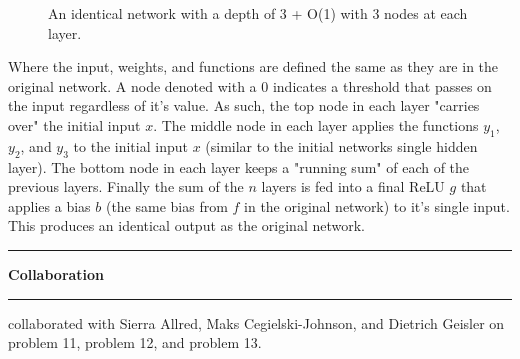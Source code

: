 \documentclass[11pt]{article}
\newcommand\question[2]{\vspace{.25in}\hrule\textbf{#1}\vspace{.5em}\hrule\vspace{.10in}}
\begin{document}
{{\begin{figure}[H]
\caption{An identical network with a depth of 3 + O(1) with 3 nodes at each layer.}
\end{figure}

Where the input, weights, and functions are defined the same as they are in the original network. A node denoted with a $0$ indicates a threshold that passes on the input regardless of it's value. As such, the top node in each layer "carries over" the initial input $x$. The middle node in each layer applies the functions $y_1$, $y_2$, and $y_3$ to the initial input $x$ (similar to the initial networks single hidden layer). The bottom node in each layer keeps a "running sum" of each of the previous layers. Finally the sum of the $n$ layers is fed into a final ReLU $g$ that applies a bias $b$ (the same bias from $f$ in the original network) to it's single input. This produces an identical output as the original network.
} }


\newpage

\question{Collaboration}

I collaborated with Sierra Allred, Maks Cegielski-Johnson, and Dietrich Geisler on problem 11, problem 12, and problem 13. \newline
\end{document}

